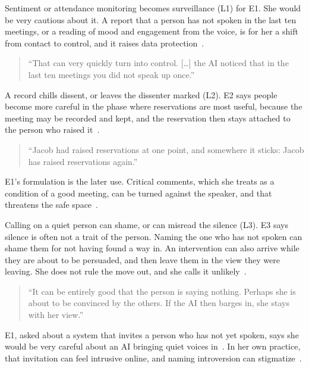 Sentiment or attendance monitoring becomes surveillance (L1) for E1.
She would be very cautious about it.
A report that a person has not spoken in the last ten meetings, or a reading of mood and
engagement from the voice, is for her a shift from contact to control, and it raises data
protection~.
{\setlength{\topsep}{0.25\baselineskip}\setlength{\partopsep}{0pt}%
  \begin{quote}\small
    \enquote{That can very quickly turn into control. [\ldots] the AI noticed that in the last ten
    meetings you did not speak up once.}~
\end{quote}}

A record chills dissent, or leaves the dissenter marked (L2).
E2 says people become more careful in the phase where reservations are most useful, because
the meeting may be recorded and kept, and the reservation then stays attached to the person
who raised it~.
{\setlength{\topsep}{0.25\baselineskip}\setlength{\partopsep}{0pt}%
  \begin{quote}\small
    \enquote{Jacob had raised reservations at one point, and somewhere it sticks: Jacob has raised
    reservations again.}~
\end{quote}}
E1's formulation is the later use.
Critical comments, which she treats as a condition of a good meeting, can be turned against
the speaker, and that threatens the safe space~.

Calling on a quiet person can shame, or can misread the silence (L3).
E3 says silence is often not a trait of the person.
Naming the one who has not spoken can shame them for not having found a way in.
An intervention can also arrive while they are about to be persuaded, and then leave them
in the view they were leaving.
She does not rule the move out, and she calls it unlikely~.
{\setlength{\topsep}{0.25\baselineskip}\setlength{\partopsep}{0pt}%
  \begin{quote}\small
    \enquote{It can be entirely good that the person is saying nothing. Perhaps she is about to
    be convinced by the others. If the AI then barges in, she stays with her view.}~
\end{quote}}
E1, asked about a system that invites a person who has not yet spoken, says she would be
very careful about an AI bringing quiet voices in~.
In her own practice, that invitation can feel intrusive online, and naming introversion can
stigmatize~.

